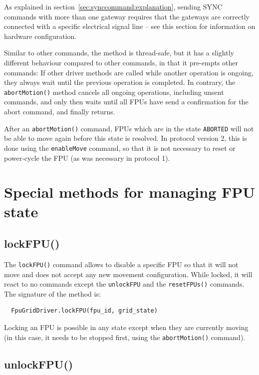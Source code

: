 \documentclass[fontsize=12,a4paper]{scrreprt}
\begin{document}
As explained in section~\ref{sec:synccommand:explanation}, sending
SYNC commands with more than one gateway requires that the gateways
are correctly connected with a specific electrical signal line -- see
this section for information on hardware configuration.


Similar to other commands, the method is thread-safe, but it has a
slightly different behaviour compared to other commands, in that it
pre-empts other commands: If other driver methods are called while
another operation is ongoing, they always wait until the previous
operation is completed. In contrary, the \texttt{abortMotion()} method
cancels all ongoing operations, including unsent commands, and only
then waits until all FPUs have send a confirmation for the abort
command, and finally returns.

After an \texttt{abortMotion()} command, FPUs which are in the state
\texttt{ABORTED} will not be able to move again before this state is
resolved. In protocol version 2, this is done using the
\texttt{enableMove} command, so that it is not necessary to reset or
power-cycle the FPU (as was necessary in protocol 1).


\chapter{Special methods for managing FPU state}
\minitoc

\section{lockFPU()}
\label{sec:lockFPU}
 

The \texttt{lockFPU()} command allows to disable a specific FPU so
that it will not move and does not accept any new movement
configuration.  While locked, it will react to no commands except the
\texttt{unlockFPU} and the \texttt{resetFPUs()} commands.
The signature of the method is:

\begin{verbatim}
  FpuGridDriver.lockFPU(fpu_id, grid_state)
\end{verbatim}


Locking an FPU is possible in any state except when they are currently
moving (in this case, it needs to be stopped first, using the
\texttt{abortMotion()} command).


\section{unlockFPU()}
\label{sec:unlockFPU}
\end{document}
